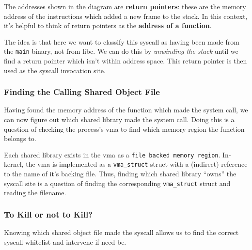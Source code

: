 
%
%
%
%

The addresses shown in the diagram are \textbf{return pointers}: these are the
memory address of the instructions which added a new frame to the stack. In this
context, it's helpful to think of return pointers as the \textbf{address of a function}.

The idea is that here we want to classify this syscall as having been made from
the \texttt{main} binary, not from \ac{libc}. We can do this by
\textit{unwinding the stack} until we find a return pointer which isn't within
 address space. This return pointer is then used as the syscall
invocation site.


\subsubsection{Finding the Calling Shared Object File}\label{subsubsec:find_so}

Having found the memory address of the function which made the system call, we
can now figure out which shared library made the system call. Doing this is a
question of checking the process's \ac{vma} to find which memory region the
function belongs to. 

Each shared library exists in the \ac{vma} as a \texttt{file backed memory region}.
In-kernel, the \ac{vma} is implemented as a \texttt{vma\_struct} struct with a
(indirect) reference to the name of it's backing file. Thus, finding which
shared library ``owns'' the syscall site is a question of finding the
corresponding \texttt{vma\_struct} struct and reading the filename.

\subsubsection{To Kill or not to Kill?}

Knowing which shared object file made the syscall allows us to find the correct
syscall whitelist and intervene if need be.

